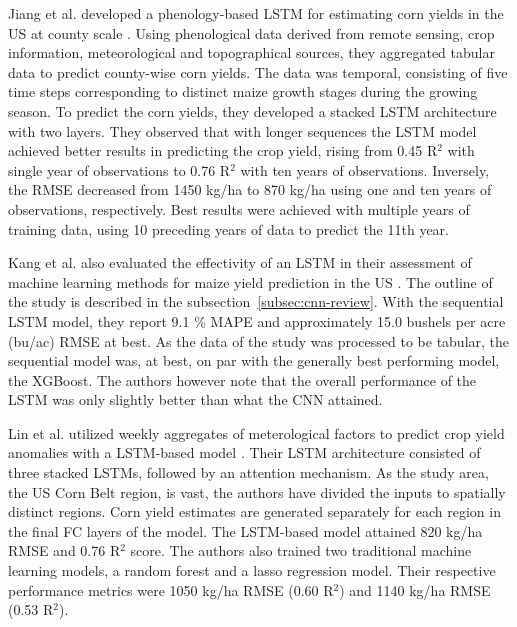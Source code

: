 Jiang et al. developed a phenology-based LSTM for estimating corn yields in the US at county scale \cite{Jiang2020}. Using phenological data derived from remote sensing, crop information, meteorological and topographical sources, they aggregated tabular data to predict county-wise corn yields. The data was temporal, consisting of five time steps corresponding to distinct maize growth stages during the growing season. To predict the corn yields, they developed a stacked LSTM architecture with two layers. They observed that with longer sequences the LSTM model achieved better results in predicting the crop yield, rising from 0.45 R$^2$ with single year of observations to 0.76 R$^2$ with ten years of observations. Inversely, the RMSE decreased from 1450 kg/ha to 870 kg/ha using one and ten years of observations, respectively. Best results were achieved with multiple years of training data, using 10 preceding years of data to predict the 11th year. 

Kang et al. also evaluated the effectivity of an LSTM in their assessment of machine learning methods for maize yield prediction in the US \cite{Kang2020}. The outline of the study is described in the subsection~\ref{subsec:cnn-review}. With the sequential LSTM model, they report 9.1 \% MAPE and approximately 15.0 bushels per acre (bu/ac) RMSE at best. As the data of the study was processed to be tabular, the sequential model was, at best, on par with the generally best performing model, the XGBoost. The authors however note that the overall performance of the LSTM was only slightly better than what the CNN attained.

Lin et al. utilized weekly aggregates of meterological factors to predict crop yield anomalies with a LSTM-based model \cite{Lin2020}. Their LSTM architecture consisted of three stacked LSTMs, followed by an attention mechanism. As the study area, the US Corn Belt region, is vast, the authors have divided the inputs to spatially distinct regions. Corn yield estimates are generated separately for each region in the final FC layers of the model. The LSTM-based model attained 820 kg/ha RMSE and 0.76 R$^2$ score. The authors also trained two traditional machine learning models, a random forest and a lasso regression model. Their respective performance metrics were 1050 kg/ha RMSE (0.60 R$^2$) and 1140 kg/ha RMSE (0.53 R$^2$).


